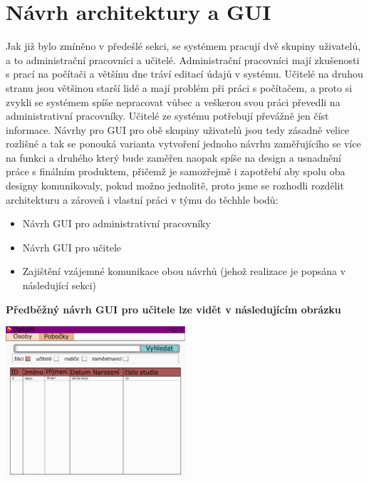 \documentclass[a4paper, 11pt, twocolumn]{article}
\begin{document}
	\section*{\large{Návrh architektury a GUI}}
	\vspace*{-0.2cm}
	Jak již bylo zmíněno v předešlé sekci, se systémem pracují dvě skupiny uživatelů, a to administrační pracovníci a učitelé. Administrační pracovníci mají 
	zkušenosti s prací na počítači a většínu dne tráví editací údajů v systému. Učitelé na druhou stranu jsou většinou starší lidé a mají problém při práci s 
	počítačem, a proto si zvykli se systémem spíše nepracovat vůbec a veškerou svou práci převedli na administrativní pracovníky. Učitelé ze systému potřebují 
	převážně jen číst informace. Návrhy pro GUI pro obě skupiny uživatelů jsou tedy zásadně velice rozlišné a tak se ponouká varianta vytvoření jednoho návrhu 
	zaměřujícího se více na funkci a druhého který bude zaměřen naopak spíše na design a usnadnění práce s finálním produktem, přičemž je samozřejmě i 
	zapotřebí aby spolu oba designy komunikovaly, pokud možno jednolitě, proto jsme se rozhodli rozdělit architekturu a zároveň i vlastní práci v týmu do 
	těchhle bodů: \\
	\vspace*{-0.6cm}
	\begin{itemize}
		\item Návrh GUI pro administrativní pracovníky
		\vspace{-0.2cm}
		\item Návrh GUI pro učitele
		\vspace{-0.2cm}
		\item Zajištění vzájemné komunikace obou návrhů (jehož realizace je popsána v následující sekci)
	\end{itemize}
	\vspace*{0.4cm}

	\noindent\textbf{Předběžný návrh GUI pro učitele lze vidět v následujícím obrázku} 
	\begin{center}
	\includegraphics[width=0.5\textwidth]{GUI.pdf}
	\end{center}
\end{document}
